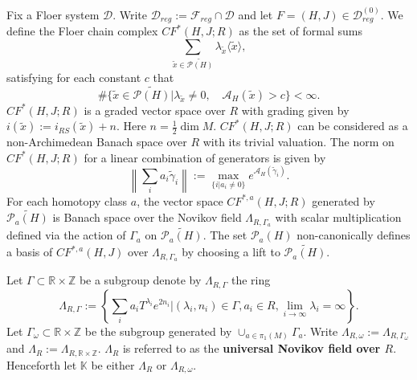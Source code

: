 \documentclass[11pt]{amsart}
\newcommand{\R}{\mathbb{R}}
\newcommand{\Z}{\mathbb{Z}}
\newcommand{\K}{\mathbb{K}}
\theoremstyle{definition}
\theoremstyle{remark}
\begin{document}
Fix a Floer system $\mathcal{D}$. Write $\mathcal{D}_{reg}:=\mathcal{F}_{reg}\cap\mathcal{D}$ and let $F=(H,J)\in\mathcal{D}^{(0)}_{reg}$. We define the Floer chain complex $CF^*(H,J;R)$ as the set of formal sums
\[
\sum_{\tilde{x}\in\widetilde{\mathcal{P}(H)}}\lambda_{\tilde{x}}\langle\tilde{x}\rangle,
\]
satisfying for each constant $c$ that
\begin{equation}\label{eqFinCond}
\#\{\tilde{x}\in\widetilde{\mathcal{P}(H)}|\lambda_{\tilde{x}}\neq 0,\quad\mathcal{A}_H(\tilde{x})>c\}<\infty.
\end{equation}
$CF^*(H,J;R)$ is a graded vector space over $R$ with grading given by $i(\tilde{x}):=i_{RS}(\tilde{x})+n$. Here $n=\frac12\dim M$. $CF^*(H,J;R)$ can be considered as a non-Archimedean Banach space over $R$ with its trivial valuation. The norm on  $CF^*(H,J;R)$ for a linear combination of generators is given by
\begin{equation}\label{NonArchNormDef}
\left\|\sum_ia_i\tilde{\gamma}_i\right\|:=\max_{\{i|a_i\neq 0\}}e^{\mathcal{A}_H(\tilde{\gamma}_i)}.
\end{equation}
For each homotopy class $a$, the vector space $CF^{*,a}(H,J;R)$ generated by $\widetilde{\mathcal{P}_a(H)}$ is Banach space over the Novikov field $\Lambda_{R,\Gamma_a}$ with scalar multiplication defined via the action of $\Gamma_a$ on $\widetilde{\mathcal{P}_a(H)}$. The set $\mathcal{P}_a(H)$ non-canonically defines a basis of $CF^{*,a}(H,J)$ over $\Lambda_{R,\Gamma_a}$ by choosing a lift to $\widetilde{\mathcal{P}_a(H)}$.

Let $\Gamma\subset\R\times\Z$ be a subgroup denote by $\Lambda_{R,\Gamma}$ the ring
\[
\Lambda_{R,\Gamma}:=\left\{\sum_i a_iT^{\lambda_i}e^{2n_i}|(\lambda_i,n_i)\in\Gamma, a_i\in R,\lim_{i\to\infty}\lambda_i=\infty\right\}.
\]
Let $\Gamma_{\omega}\subset\R\times\Z$ be the subgroup generated by $\cup_{a\in\pi_1(M)}\Gamma_a$. Write $\Lambda_{R,\omega}:=\Lambda_{R,\Gamma_{\omega}}$ and
$\Lambda_R:=\Lambda_{R,\R\times\Z}$. $\Lambda_R$ is referred to as the \textbf{universal Novikov field over $R$}. Henceforth let $\K$ be either $\Lambda_R$ or $\Lambda_{R,\omega}$.
\end{document}
